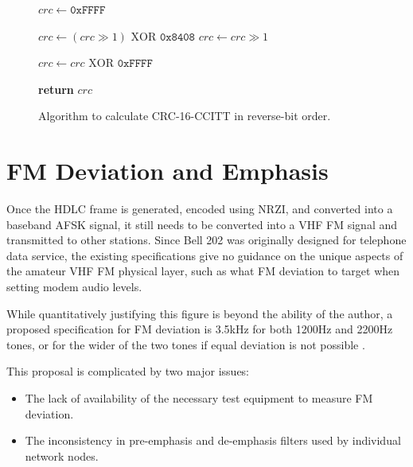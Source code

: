 \documentclass[12pt,letterpaper]{article}
\begin{document}
\begin{figure}
	\begin{algorithmic}[1]
		\State $crc \gets \texttt{0xFFFF}$

			\State $crc \gets (crc \gg 1) \textrm{ XOR } \texttt{0x8408}$
		\Else
			\State $crc \gets crc \gg 1$
		\EndIf
		\EndFor
		\EndFor

		\State $crc \gets crc \textrm{ XOR } \texttt{0xFFFF}$

		\State \textbf{return} $crc$
		\EndFunction
	\end{algorithmic}
	\caption{Algorithm to calculate CRC-16-CCITT in reverse-bit order.}
	\label{fig:crcccittcode}
\end{figure}

\section{FM Deviation and Emphasis}

Once the HDLC frame is generated, encoded using NRZI, and converted into
a baseband AFSK signal, it still needs to be converted into a VHF FM signal
and transmitted to other stations. 
Since Bell 202 was originally designed for telephone data service, 
the existing specifications give no guidance on the unique 
aspects of the amateur VHF FM physical layer, such as what 
FM deviation to target when setting modem audio levels.

While quantitatively justifying this figure is beyond the ability of the
author, a proposed specification for FM deviation is 3.5kHz for both
1200Hz and 2200Hz tones, or for the wider of the two tones if equal
deviation is not possible \cite{millerinterview}.

This proposal is complicated by two major issues: 
\begin{itemize}
	\item The lack of availability of the necessary 
		test equipment to measure FM deviation.
	\item The inconsistency in pre-emphasis and de-emphasis filters
		used by individual network nodes.
\end{itemize}
\end{document}
